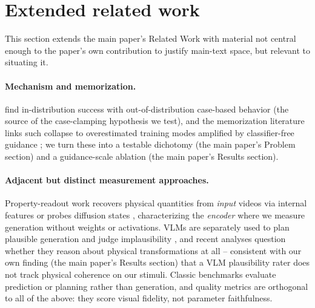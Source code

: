 \documentclass[10pt,twocolumn,letterpaper]{article}
\begin{document}
\section{Extended related work}
\label{app:related}
This section extends the main paper's Related Work with material not
central enough to the paper's own contribution to justify main-text space,
but relevant to situating it.

\paragraph{Mechanism and memorization.} \citet{kang2025howfar} find
in-distribution success with out-of-distribution case-based behavior
(the source of the case-clamping hypothesis we test), and the
memorization literature links such collapse to overestimated training
modes amplified by classifier-free guidance \citep{diffmemorize2025}; we
turn these into a testable dichotomy (the main paper's Problem section)
and a guidance-scale ablation (the main paper's Results section).

\paragraph{Adjacent but distinct measurement approaches.}
Property-readout work recovers physical quantities from \emph{input}
videos via internal features \citep{inferring2025dynamic} or probes
diffusion states \citep{invisiblehand2026}, characterizing the
\emph{encoder} where we measure generation without weights or
activations. VLMs are separately used to plan plausible generation
\citep{vlipp2025} and judge implausibility \citep{travl2025}, and recent
analyses question whether they reason about physical transformations at
all \citep{vlmcannotreason2026} -- consistent with our own finding (the
main paper's Results section) that a VLM plausibility rater does not
track physical coherence on our stimuli. Classic benchmarks
\citep{bear2021physion,bakhtin2019phyre} evaluate prediction or planning
rather than generation, and quality metrics
\citep{unterthiner2018fvd,huang2024vbench} are orthogonal to all of the
above: they score visual fidelity, not parameter faithfulness.

{
    \small
    
    
}
\end{document}
